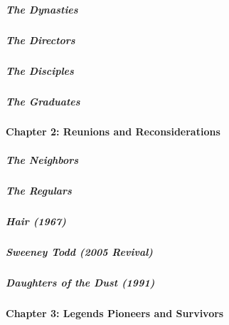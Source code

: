 \hypertarget{the-dynasties}{%
\subparagraph{The Dynasties}\label{the-dynasties}}

\href{/interactive/2020/04/13/t-magazine/gordon-parks.html}{}

\hypertarget{the-directors}{%
\subparagraph{The Directors}\label{the-directors}}

\href{/interactive/2020/04/13/t-magazine/enrique-olvera-chef.html}{}

\hypertarget{the-disciples}{%
\subparagraph{The Disciples}\label{the-disciples}}

\href{/interactive/2020/04/13/t-magazine/royal-academy-antwerp.html}{}

\hypertarget{the-graduates}{%
\subparagraph{The Graduates}\label{the-graduates}}

\hypertarget{chapter-2-reunions-and-reconsiderations}{%
\paragraph{Chapter 2: Reunions and
Reconsiderations}\label{chapter-2-reunions-and-reconsiderations}}

\href{/interactive/2020/04/13/t-magazine/ninth-street-greenwich-village-neighbors.html}{}

\hypertarget{the-neighbors}{%
\subparagraph{The Neighbors}\label{the-neighbors}}

\href{/interactive/2020/04/13/t-magazine/omen-restaurant-nyc.html}{}

\hypertarget{the-regulars}{%
\subparagraph{The Regulars}\label{the-regulars}}

\href{/interactive/2020/04/13/t-magazine/hair-musical-broadway.html}{}

\hypertarget{hair-1967}{%
\subparagraph{Hair (1967)}\label{hair-1967}}

\href{/interactive/2020/04/13/t-magazine/sweeney-todd-revival.html}{}

\hypertarget{sweeney-todd-2005-revival}{%
\subparagraph{Sweeney Todd (2005
Revival)}\label{sweeney-todd-2005-revival}}

\href{/interactive/2020/04/13/t-magazine/daughters-of-the-dust.html}{}

\hypertarget{daughters-of-the-dust-1991}{%
\subparagraph{Daughters of the Dust
(1991)}\label{daughters-of-the-dust-1991}}

\hypertarget{chapter-3-legends-pioneers-and-survivors-1}{%
\paragraph{Chapter 3: Legends Pioneers and
Survivors}\label{chapter-3-legends-pioneers-and-survivors-1}}

